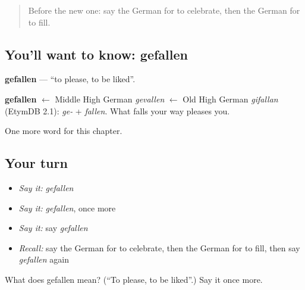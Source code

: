 \label{lesson:GE-C146-gefallen}



\begin{quote}
Before the new one: say the German for to celebrate, then the German for to fill.
\end{quote}

\subsection*{You'll want to know: gefallen}
\textbf{gefallen} — \textquotedblleft{}to please, to be liked\textquotedblright{}.

\begin{cousinweb}
\textbf{gefallen} $\leftarrow$ Middle High German \emph{gevallen} $\leftarrow$ Old High German \emph{gifallan} (EtymDB 2.1): \emph{ge-} + \emph{fallen}. What falls your way pleases you.
\end{cousinweb}

\begin{grammarlens}[title={What you've built}]
One more word for this chapter.
\end{grammarlens}

\subsection*{Your turn}
\begin{itemize}
\raggedright
  \item \emph{Say it:} \emph{gefallen}
  \item \emph{Say it:} \emph{gefallen}, once more
  \item \emph{Say it:} say \emph{gefallen}
  \item \emph{Recall:} say the German for to celebrate, then the German for to fill, then say \emph{gefallen} again
\end{itemize}

\begin{tcolorbox}[breakable,colback=teal!4,colframe=teal!35!black,title={Before you move on}]
What does gefallen mean? (\textquotedblleft{}To please, to be liked\textquotedblright{}.) Say it once more.
\end{tcolorbox}
